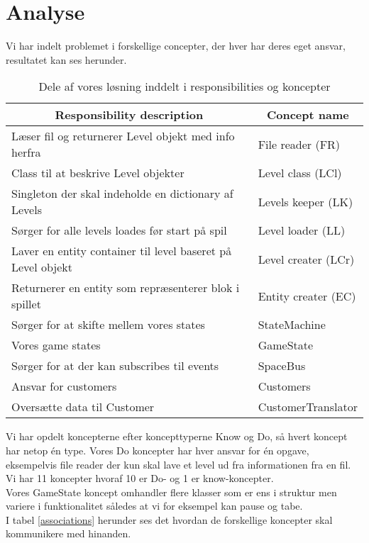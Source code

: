 \section{Analyse}
Vi har indelt problemet i forskellige concepter, der hver har deres eget ansvar, resultatet kan ses herunder.\\

\begin{table}[!h]
\centering
\begin{tabular}{|l|l|}
\hline
\multicolumn{1}{|c|}{\textbf{Responsibility description}}            & \multicolumn{1}{c|}{\textbf{Concept name}} \\ \hline
Læser fil og returnerer Level objekt med info herfra        & File reader (FR)                       \\ \hline
Class til at beskrive Level objekter                        & Level class (LCl)                       \\ \hline
Singleton der skal indeholde en dictionary af Levels        & Levels keeper (LK)                    \\ \hline
Sørger for alle levels loades før start på spil             & Level loader (LL)                     \\ \hline
Laver en entity container til level baseret på Level objekt & Level creater (LCr)                     \\ \hline
Returnerer en entity som repræsenterer blok i spillet       & Entity creater (EC)                    \\ \hline
Sørger for at skifte mellem vores states & StateMachine \\ \hline
Vores game states & GameState\\ \hline
Sørger for at der kan subscribes til events & SpaceBus\\ \hline
Ansvar for customers & Customers\\ \hline
Oversætte data til Customer & CustomerTranslator\\
\hline
\end{tabular}
\caption{Dele af vores løsning inddelt i responsibilities og koncepter}
\label{responsibilities}
\end{table}

\newpage

Vi har opdelt koncepterne efter koncepttyperne Know og Do, så hvert koncept har netop én type. Vores Do koncepter har hver ansvar for én opgave, eksempelvis file reader der kun skal lave et level ud fra informationen fra en fil. Vi har 11 koncepter hvoraf 10 er Do- og 1 er know-koncepter.\\
Vores GameState koncept omhandler flere klasser som er ens i struktur men variere i funktionalitet således at vi for eksempel kan pause og tabe.\\
I tabel \ref{associations} herunder ses det hvordan de forskellige koncepter skal kommunikere med hinanden.

